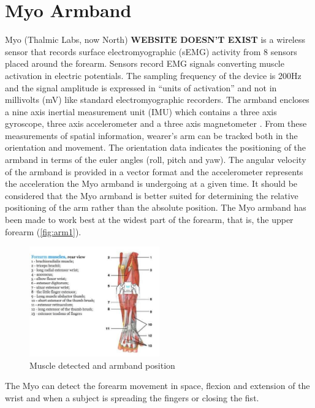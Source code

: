 \documentclass{vgtc}
\begin{document}
\section{Myo Armband}
Myo (Thalmic Labs, now North) \cite{myowebsite} \textbf{WEBSITE DOESN'T EXIST} is a wireless sensor that records surface electromyographic (sEMG) activity from 8 sensors placed around the forearm. Sensors record EMG signals converting muscle activation in electric potentials. The sampling frequency of the device is 200Hz and the signal amplitude is expressed in “units of activation” and not in millivolts (mV) like standard electromyographic recorders. The armband encloses a nine axis inertial measurement unit (IMU) which contains a three axis gyroscope, three axis accelerometer and a three axis magnetometer \cite{myowebsite}. From these measurements of spatial information, wearer’s arm can be tracked both in the orientation and movement. The orientation data indicates the positioning of the armband in terms of the euler angles (roll, pitch and yaw). The angular velocity of the armband is provided in a vector format and the accelerometer represents the acceleration the Myo armband is undergoing at a given time. It should be considered that the Myo armband is better suited for determining the relative positioning of the arm rather than the absolute position. The Myo armband has been made to work best at the widest part of the forearm, that is, the upper forearm (\autoref{fig:arm1}).
\begin{figure}[h]
\includegraphics[width=0.5\textwidth]{myo_armband_muscles}
\caption{Muscle detected and armband position}
\centering
\label{fig:arm1}
\end{figure}
The Myo can detect the forearm movement in space, flexion and extension of the wrist and when a subject is spreading the fingers or closing the fist. 
\end{document}
